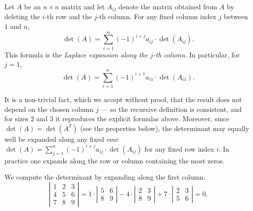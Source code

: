 \begin{definition}
Let $A$ be an $n\times n$ matrix and let $A_{ij}$ denote the matrix obtained from $A$ by deleting the $i$-th
row and the $j$-th column. For any fixed column index $j$ between $1$ and $n$,
\[
\det(A) = \sum_{i=1}^{n} (-1)^{i+j} a_{ij}\cdot \det(A_{ij}).
\]
This formula is the \emph{Laplace expansion along the $j$-th column}. In particular, for $j=1$,
\[
\det(A) = \sum_{i=1}^{n} (-1)^{i+1} a_{i 1}\cdot \det(A_{i 1}).
\]
\end{definition}

\begin{remark}
It is a non-trivial fact, which we accept without proof, that the result does not depend on the chosen
column $j$ — so the recursive definition is consistent, and for sizes $2$ and $3$ it reproduces the
explicit formulas above. Moreover, since $\det(A) = \det(A^T)$ (see the properties below), the determinant
may equally well be expanded along any fixed \emph{row}:
$\det(A) = \sum_{j=1}^{n} (-1)^{i+j} a_{ij}\cdot\det(A_{ij})$ for any fixed row index $i$. In practice one
expands along the row or column containing the most zeros.
\end{remark}

\begin{example}
We compute the determinant by expanding along the first column:
\[
\left | \begin{array}{ccc}
1 & 2 & 3\\ 4 & 5 & 6\\ 7 & 8 & 9
\end{array} \right |
= 1\cdot\left | \begin{array}{cc} 5 & 6\\ 8 & 9 \end{array} \right |
- 4 \cdot \left | \begin{array}{cc} 2 & 3\\ 8 & 9 \end{array} \right |
+ 7\cdot \left | \begin{array}{cc} 2 & 3\\ 5 & 6 \end{array} \right | = 0.
\]
\end{example}

